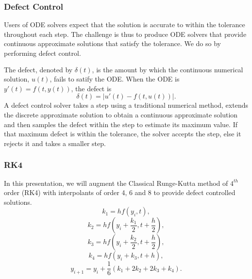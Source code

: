 \documentclass{beamer}
\begin{document}
\begin{frame}
\frametitle{Defect Control}
Users of ODE solvers expect that the solution is accurate to within the tolerance throughout each step.
The challenge is thus to produce ODE solvers that provide continuous approximate solutions that satisfy the tolerance. We do so by performing defect control.

The defect, denoted by $\delta(t)$,  is the amount by which the continuous numerical solution, $u(t)$, fails to satify the ODE. 
When the ODE is $y'(t) = f(t, y(t))$, the defect is 
\begin{equation}
\delta(t) = |u'(t) - f(t, u(t))|.
\end{equation}
A defect control solver takes a step using a traditional numerical method, extends the discrete approximate solution to obtain a continuous approximate solution and then samples the defect within the step to estimate its maximum value. If that maximum defect is within the tolerance, the solver accepts the step, else it rejects it and takes a smaller step.
\end{frame}

\begin{frame}
\frametitle{RK4}
In this presentation, we will augment the Classical Runge-Kutta method of $4^{th}$ order (RK4) with interpolants of order 4, 6 and 8 to provide defect controlled solutions.
\begin{equation}
k_1 = h f(y_i, t),
\end{equation}
\begin{equation}
k_2 = h f(y_i + \frac{k_1}{2}, t + \frac{h}{2}),
\end{equation}
\begin{equation}
k_3 = hf(y_i + \frac{k_2}{2}, t + \frac{h}{2}),
\end{equation}
\begin{equation}
k_4 = hf(y_i + k_3, t + h),
\end{equation}
\begin{equation}
y_{i+1} = y_i + \frac{1}{6}(k_1 + 2k_2 + 2k_3 + k_4).
\end{equation}

\end{frame}
\end{document}
